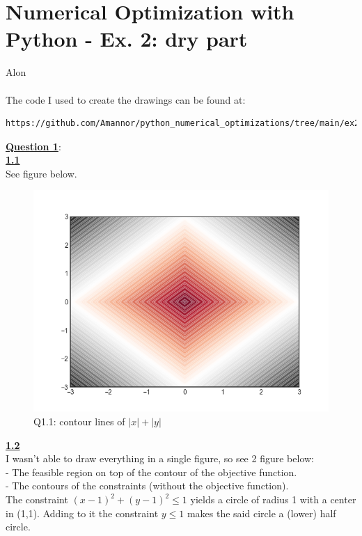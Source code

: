 \documentclass[fleqn]{article}
\begin{document}
\newcommand\tab[1][1cm]{\hspace*{#1}}
\section*{Numerical Optimization with Python -  Ex. 2: dry part}
Alon\\ \\

The code I used to create the drawings can be found at:\\

\begin{lstlisting}[breaklines]
https://github.com/Amannor/python_numerical_optimizations/tree/main/ex2/dry_part
\end{lstlisting}

\underline{\textbf{Question 1}}:\\

\underline{\textbf{1.1}} \\
See figure below. \\

\begin{figure}[h!]
\includegraphics[width=0.8\linewidth]{q1_1.PNG}
\caption{Q1.1: contour lines of $\lvert x\rvert +\lvert y \rvert$}
\end{figure}

\underline{\textbf{1.2}} \\
I wasn't able to draw everything in a single figure, so see 2 figure below:\\
- The feasible region on top of the contour of the objective function. \\
- The contours of the constraints (without the objective function). \\

The constraint $(x-1)^2+(y-1)^2 \leq 1$ yields a circle of radius 1 with a center in (1,1). Adding to it the constraint $y \leq 1$ makes the said circle a (lower) half circle.\\
\end{document}
